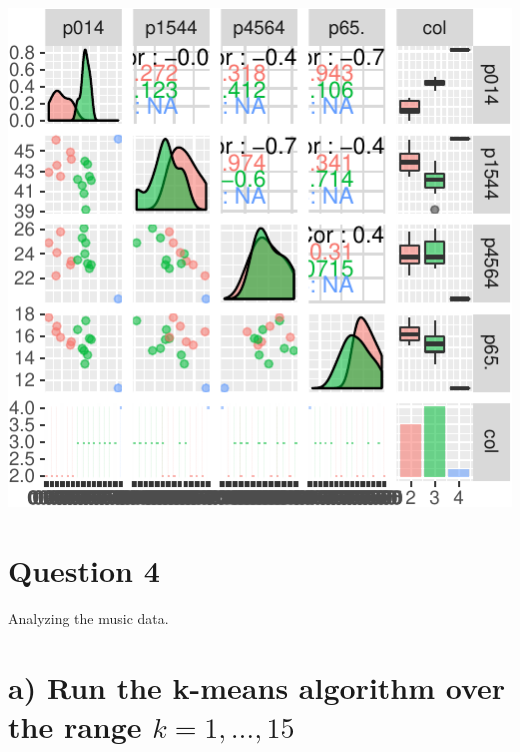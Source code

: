 \documentclass[]{article}
\newenvironment{Shaded}{\begin{snugshade}}{\end{snugshade}}
\newcommand{\DataTypeTok}[1]{\textcolor[rgb]{0.13,0.29,0.53}{#1}}
\newcommand{\DecValTok}[1]{\textcolor[rgb]{0.00,0.00,0.81}{#1}}
\newcommand{\FloatTok}[1]{\textcolor[rgb]{0.00,0.00,0.81}{#1}}
\newcommand{\KeywordTok}[1]{\textcolor[rgb]{0.13,0.29,0.53}{\textbf{#1}}}
\newcommand{\NormalTok}[1]{#1}
\newcommand{\OperatorTok}[1]{\textcolor[rgb]{0.81,0.36,0.00}{\textbf{#1}}}
\newcommand{\StringTok}[1]{\textcolor[rgb]{0.31,0.60,0.02}{#1}}
\begin{document}
\begin{Shaded}
\end{Shaded}

\begin{center}\includegraphics{sol_A1_files/figure-latex/unnamed-chunk-9-3} \end{center}

\newpage

\hypertarget{question-4}{%
\section{Question 4}\label{question-4}}

Analyzing the music data.

\hypertarget{a-run-the-k-means-algorithm-over-the-range-k-1dots-15}{%
\section{\texorpdfstring{a) Run the k-means algorithm over the range
\(k = 1,\dots, 15\)}{a) Run the k-means algorithm over the range k = 1,\textbackslash{}dots, 15}}\label{a-run-the-k-means-algorithm-over-the-range-k-1dots-15}}
\end{document}
